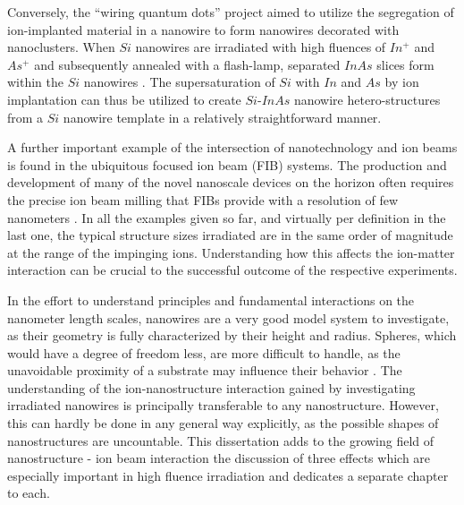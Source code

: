 Conversely, the ``wiring quantum dots'' project aimed to utilize the segregation of ion-implanted material in a nanowire to form nanowires decorated with nanoclusters. When $Si$ nanowires are irradiated with high fluences of $In^+$ and $As^+$ and subsequently annealed with a flash-lamp, separated $InAs$ slices form within the $Si$ nanowires \cite{prucnal_iii-v_2014,glaser_personal_2015}. The supersaturation of $Si$ with $In$ and $As$ by ion implantation can thus be utilized to create $Si$-$InAs$ nanowire hetero-structures from a $Si$ nanowire template in a relatively straightforward manner.
 
A further important example of the intersection of nanotechnology and ion beams is found in the ubiquitous focused ion beam (FIB) systems. The production and development of many of the novel nanoscale devices on the horizon often requires the precise ion beam milling that FIBs provide with a resolution of few nanometers \cite{kranz_integrating_2001,george_nanopore_2010,chalapat_self-organized_2013}. In all the examples given so far, and virtually per definition in the last one, the typical structure sizes irradiated are in the same order of magnitude at the range of the impinging ions. Understanding how this affects the ion-matter interaction can be crucial to the successful outcome of the respective experiments.

In the effort to understand principles and fundamental interactions on the nanometer length scales, nanowires are a very good model system to investigate, as their geometry is fully characterized by their height and radius. Spheres, which would have a degree of freedom less, are more difficult to handle, as the unavoidable proximity of a substrate may influence their behavior \cite{hu_burrowing_2002,klimmer_size-dependent_2009,moller_tri3dyn_2014,johannes_ion_2015}. The understanding of the ion-nanostructure interaction gained by investigating irradiated nanowires is principally transferable to any nanostructure. However, this can hardly be done in any general way explicitly, as the possible shapes of nanostructures are uncountable. This dissertation adds to the growing field of nanostructure - ion beam interaction the discussion of three effects which are especially important in high fluence irradiation and dedicates a separate chapter to each. 
 
